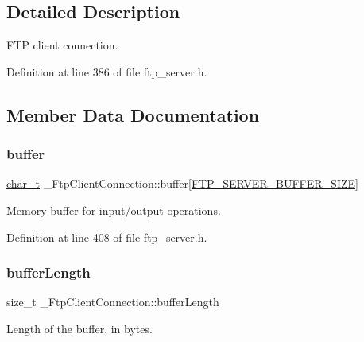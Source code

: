 \subsection{Detailed Description}
F\+TP client connection. 

Definition at line 386 of file ftp\+\_\+server.\+h.



\subsection{Member Data Documentation}
\mbox{\label{struct__FtpClientConnection_ab44673cccab94f0632ae554a0989a94d}} 
\subsubsection{\texorpdfstring{buffer}{buffer}}
{\footnotesize\ttfamily \hyperlink{compiler__port_8h_a40bb5262bf908c328fbcfbe5d29d0201}{char\+\_\+t} \+\_\+\+Ftp\+Client\+Connection\+::buffer\mbox{[}\hyperlink{ftp__server_8h_a37067cf14f1730ca29fec31f4c8a2bff}{F\+T\+P\+\_\+\+S\+E\+R\+V\+E\+R\+\_\+\+B\+U\+F\+F\+E\+R\+\_\+\+S\+I\+ZE}\mbox{]}}



Memory buffer for input/output operations. 



Definition at line 408 of file ftp\+\_\+server.\+h.

\mbox{\label{struct__FtpClientConnection_ae6308df790baf35244826e38761696b5}} 
\subsubsection{\texorpdfstring{buffer\+Length}{bufferLength}}
{\footnotesize\ttfamily size\+\_\+t \+\_\+\+Ftp\+Client\+Connection\+::buffer\+Length}



Length of the buffer, in bytes. 



